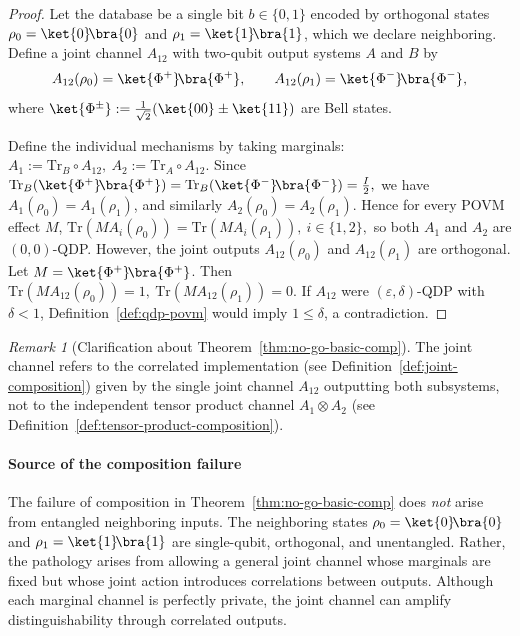 \documentclass[11pt]{article}
\def\Tr{\mathrm{Tr}}
\theoremstyle{plain}
\theoremstyle{remark}
\newtheorem{remark}[theo]{Remark}
\begin{document}
\begin{proof}
Let the database be a single bit $b\in\{0,1\}$ encoded by orthogonal states
$\rho_0=\ket{0}\!\bra{0}$ and $\rho_1=\ket{1}\!\bra{1}$, which we declare neighboring.
Define a joint channel $A_{12}$ with two-qubit output systems $A$ and $B$ by
\[
A_{12}(\rho_0) = \ket{\Phi^+}\!\bra{\Phi^+},
\qquad
A_{12}(\rho_1) = \ket{\Phi^-}\!\bra{\Phi^-},
\]
where $\ket{\Phi^\pm} := \frac{1}{\sqrt{2}}(\ket{00}\pm\ket{11})$ are Bell states.

Define the individual mechanisms by taking marginals:
$
A_1 := \Tr_B \circ A_{12},
\
A_2 := \Tr_A \circ A_{12}.
$
Since
$
\Tr_B(\ket{\Phi^+}\!\bra{\Phi^+}) = \Tr_B(\ket{\Phi^-}\!\bra{\Phi^-}) = \tfrac{I}{2},
$
we have $A_1(\rho_0)=A_1(\rho_1)$, and similarly $A_2(\rho_0)=A_2(\rho_1)$.
Hence for every POVM effect $M$,
$
\Tr(MA_i(\rho_0))=\Tr(MA_i(\rho_1)), \ i\in\{1,2\},
$
so both $A_1$ and $A_2$ are $(0,0)$-QDP.
However, the joint outputs $A_{12}(\rho_0)$ and $A_{12}(\rho_1)$ are orthogonal.
Let $M=\ket{\Phi^+}\!\bra{\Phi^+}$. Then
$
\Tr(MA_{12}(\rho_0))=1, \ \Tr(MA_{12}(\rho_1))=0.
$
If $A_{12}$ were $(\varepsilon,\delta)$-QDP with $\delta<1$, Definition~\ref{def:qdp-povm}
would imply $1\le\delta$, a contradiction.
\end{proof}

\begin{remark}[Clarification about Theorem~\ref{thm:no-go-basic-comp}]
The joint channel refers to the correlated implementation (see Definition~\ref{def:joint-composition}) given by the
single joint channel $A_{12}$ outputting both subsystems, not to the independent tensor product
channel $A_1\otimes A_2$ (see Definition~\ref{def:tensor-product-composition}).
\end{remark}


\paragraph{Source of the composition failure}
The failure of composition in Theorem~\ref{thm:no-go-basic-comp} does \emph{not}
arise from entangled neighboring inputs. The neighboring states
$\rho_0 = \ket{0}\!\bra{0}$ and $\rho_1 = \ket{1}\!\bra{1}$ are single-qubit,
orthogonal, and unentangled.
Rather, the pathology arises from allowing a general joint channel whose
marginals are fixed but whose joint action introduces correlations between
outputs. Although each marginal channel is perfectly private, the joint
channel can amplify distinguishability through correlated outputs.
\end{document}
